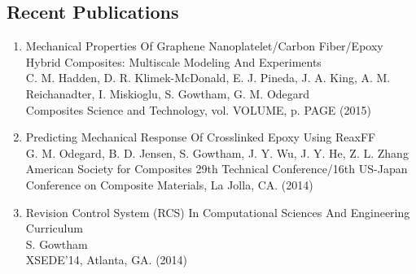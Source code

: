%
\subsection*{Recent Publications}

\begin{enumerate}
  \item \textsf{Mechanical Properties Of Graphene Nanoplatelet/Carbon Fiber/Epoxy Hybrid Composites: Multiscale Modeling And Experiments} \\ 
        C. M. Hadden, D. R. Klimek-McDonald, E. J. Pineda, J. A. King, A. M. Reichanadter, I. Miskioglu, S. Gowtham, G. M. Odegard \\
        Composites Science and Technology, vol. VOLUME, p. PAGE (2015) 

  \item \textsf{Predicting Mechanical Response Of Crosslinked Epoxy Using ReaxFF} \\ 
        G. M. Odegard, B. D. Jensen, S. Gowtham, J. Y. Wu, J. Y. He, Z. L. Zhang \\
        American Society for Composites 29th Technical Conference/16th US-Japan Conference on Composite Materials, La Jolla, CA. (2014) 

  \item \textsf{Revision Control System (RCS) In Computational Sciences And Engineering Curriculum} \\ 
        S. Gowtham \\
        XSEDE'14, Atlanta, GA. (2014) 
\end{enumerate}
